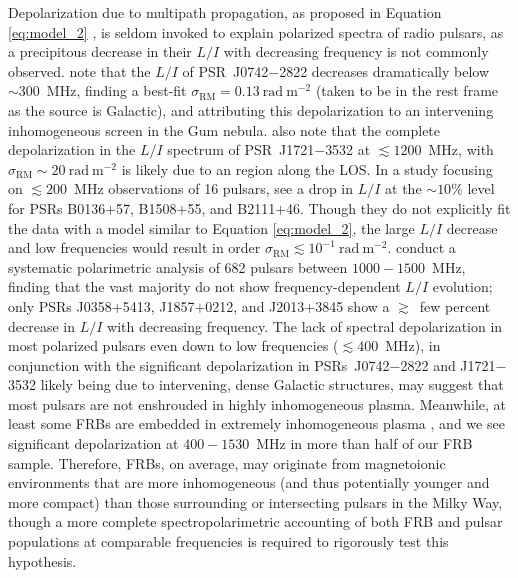 \documentclass[twocolumn, linenumbers]{aastex701}
\begin{document}
Depolarization due to multipath propagation, as proposed in Equation \ref{eq:model_2} \citep{1966MNRAS.133...67B}, is seldom invoked to explain polarized spectra of radio pulsars, as a precipitous decrease in their $L/I$ with decreasing frequency is not commonly observed. \cite{2019PASA...36...25X} note that the $L/I$ of PSR~J0742$-$2822 decreases dramatically below $\sim 300$~MHz, finding a best-fit $\sigma_\mathrm{RM} = 0.13~\mathrm{rad}~\mathrm{m}^{-2}$ (taken to be in the rest frame as the source is Galactic), and attributing this depolarization to an intervening inhomogeneous screen in the Gum nebula. \cite{2021MNRAS.504..228S} also note that the complete depolarization in the $L/I$ spectrum of PSR~J1721$-$3532 at $\lesssim 1200$~MHz, with $\sigma_\mathrm{RM} \sim 20~\mathrm{rad}~\mathrm{m}^{-2}$ is likely due to an  region along the LOS. In a study focusing on $\lesssim 200$~MHz observations of 16 pulsars, \cite{2015A&A...576A..62N} see a drop in $L/I$ at the $\sim 10$\% level for PSRs B0136$+$57, B1508$+$55, and B2111$+$46. Though they do not explicitly fit the data with a model similar to Equation \ref{eq:model_2}, the large $L/I$ decrease and low frequencies would result in order $\sigma_\mathrm{RM} \lesssim 10^{-1}~\mathrm{rad}~\mathrm{m}^{-2}$. \cite{2023RAA....23j4002W} conduct a systematic polarimetric analysis of 682 pulsars between $1000-1500$~MHz, finding that the vast majority do not show frequency-dependent $L/I$ evolution; only PSRs J0358$+$5413, J1857$+$0212, and J2013$+$3845 show a $\gtrsim$~few percent decrease in $L/I$ with decreasing frequency. The lack of spectral depolarization in most polarized pulsars even down to low frequencies ($\lesssim 400$~MHz), in conjunction with the significant depolarization in PSRs~J0742$-$2822 and J1721$-$3532 likely being due to intervening, dense Galactic structures, may suggest that most pulsars are not enshrouded in highly inhomogeneous plasma. Meanwhile, at least some FRBs are embedded in extremely inhomogeneous plasma \citep[e.g., FRBs~20121102A and 20190520B with $\sigma_\mathrm{RM,host} \sim 44~\mathrm{rad}~\mathrm{m}^{-2}$ and $\sigma_\mathrm{RM,host} \sim 340~\mathrm{rad}~\mathrm{m}^{-2}$, respectively;][]{2022Sci...375.1266F}, and we see significant depolarization at $400-1530$~MHz in more than half of our FRB sample. Therefore, FRBs, on average, may originate from magnetoionic environments that are more inhomogeneous (and thus potentially younger and more compact) than those surrounding or intersecting pulsars in the Milky Way, though a more complete spectropolarimetric accounting of both FRB and pulsar populations at comparable frequencies is required to rigorously test this hypothesis.
\end{document}
